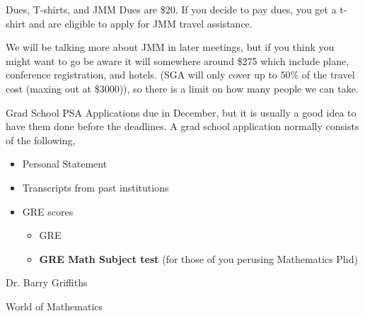 \documentclass[xcolor=dvipsnames]{beamer}
\begin{document}
\begin{frame}{Dues, T-shirts, and JMM}
Dues are \$20. \newline
If you decide to pay dues, you get a t-shirt and are eligible to apply for JMM travel assistance.\newline


\vspace{1cm}
We will be talking more about JMM in later meetings, but if you think you might want to go be aware it will somewhere around \$275 which include plane, conference registration, and hotels. (SGA will only cover up to 50\% of the travel cost (maxing out at \$3000)), so there is a limit on how many people we can take. 

\end{frame}

\begin{frame}{Grad School PSA}
Applications due in December, but it is usually a good idea to have them done before the deadlines. A grad school application normally consists of the following, 
\begin{itemize}
\item Personal Statement
\item Transcripts from past institutions
\item GRE scores
\begin{itemize}
\item GRE 
\item \textbf{GRE Math Subject test }(for those of you perusing Mathematics Phd) 

\end{itemize}
\end{itemize}
\end{frame}

\begin{frame}
\centering \Huge Dr. Barry Griffiths 


\vspace{1cm}


\centering \Huge World of Mathematics 



\end{frame}
\end{document}
